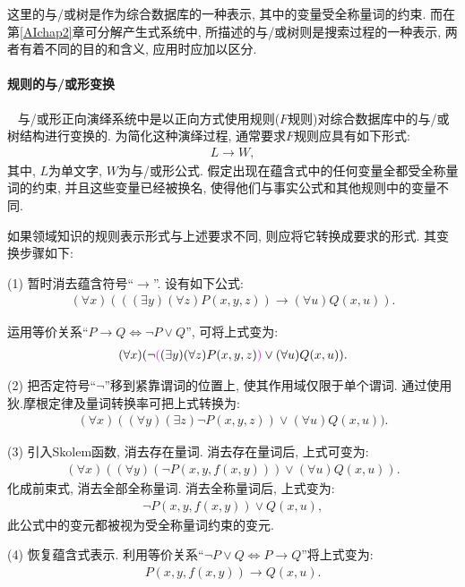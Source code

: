 \begin{remark}
    这里的与/或树是作为综合数据库的一种表示, 其中的变量受全称量词的约束. 而在第\ref{AIchap2}章可分解产生式系统中, 所描述的与/或树则是搜索过程的一种表示, 两者有着不同的目的和含义, 应用时应加以区分.
\end{remark}
\paragraph{规则的与/或形变换}~{}
    与/或形正向演绎系统中是以正向方式使用规则($F$规则)对综合数据库中的与/或树结构进行变换的. 为简化这种演绎过程, 通常要求$F$规则应具有如下形式:
\begin{align}
    L\rightarrow W,
\end{align}
其中, $L$为单文字, $W$为与/或形公式. 假定出现在蕴含式中的任何变量全都受全称量词的约束, 并且这些变量已经被换名, 使得他们与事实公式和其他规则中的变量不同.

\begin{remark}
    如果领域知识的规则表示形式与上述要求不同, 则应将它转换成要求的形式. 其变换步骤如下:

(1) 暂时消去蕴含符号“$\rightarrow$”. 设有如下公式:
\begin{align}
  (\forall x)(((\exists  y) (\forall  z)P(x, y,z))\rightarrow (\forall u)Q(x, u)).
\end{align}

运用等价关系“$P\rightarrow Q\Leftrightarrow \neg P\vee Q$”, 可将上式变为:
\begin{align}
    (\forall x)(\neg \textcolor[rgb]{1.00,0.00,1.00}{(}(\exists y) (\forall z)P(x, y,z)\textcolor[rgb]{1.00,0.00,1.00}{)}\vee (\forall u)Q(x, u)).
\end{align}

(2) 把否定符号“$\neg$”移到紧靠谓词的位置上, 使其作用域仅限于单个谓词. 通过使用狄.摩根定律及量词转换率可把上式转换为:
\begin{align}
    (\forall  x)( (\forall y) (\exists  z)\neg P(x, y,z))\vee  (\forall u)Q(x, u)).
\end{align}

(3) 引入Skolem函数, 消去存在量词. 消去存在量词后, 上式可变为:
\begin{align}
    (\forall  x)( (\forall y) (\neg P(x, y,f(x,y)))\vee (\forall u)Q(x, u)).
\end{align}
化成前束式, 消去全部全称量词. 消去全称量词后, 上式变为:
\begin{align}
    \neg P(x, y,f(x,y))\vee Q(x, u),
\end{align}
此公式中的变元都被视为受全称量词约束的变元.

(4) 恢复蕴含式表示. 利用等价关系“$\neg P\vee Q\Leftrightarrow P\rightarrow Q$”将上式变为:
\begin{align}
   P(x, y,f(x,y))\rightarrow Q(x, u).
\end{align}
\end{remark}

